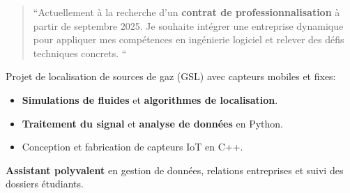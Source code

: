 \documentclass[10pt,a4paper,ragged2e,withhyper]{../AltaCV/altacv}
\begin{document}



\makecvheader


\begin{paracol}{2}

  \begin{quote}
    ``Actuellement à la recherche d'un \textbf{contrat de professionnalisation} à partir de septembre 2025.
    Je souhaite intégrer une entreprise dynamique pour appliquer mes compétences en ingénierie logiciel et relever des défis techniques concrets.
    ``
  \end{quote}



  \divider

  Projet de localisation de sources de gaz (GSL) avec capteurs mobiles et fixes:

  \begin{itemize}
    \item \textbf{Simulations de fluides} et \textbf{algorithmes de localisation}.
    \item \textbf{Traitement du signal} et \textbf{analyse de données} en Python.
    \item Conception et fabrication de capteurs IoT en C++.
  \end{itemize}

  \divider


  \textbf{Assistant polyvalent} en gestion de données, relations entreprises et suivi des dossiers étudiants.

  \divider



\end{paracol}
\end{document}
